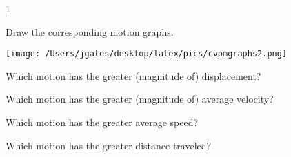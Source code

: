 
\AddToShipoutPicture*{\BackgroundPic}

\addtocounter {ProbNum} {1}

 
{\bf \Large{}}Draw the corresponding motion graphs.

\begin{center}
\texttt{[image: /Users/jgates/desktop/latex/pics/cvpmgraphs2.png]}
\end{center}

\bigskip
Which motion has the greater (magnitude of) displacement?
 
\vfill
Which motion has the greater (magnitude of) average velocity?

\vfill
Which motion has the greater average speed?

\vfill
Which motion has the greater distance traveled?

\vfill

\newpage
